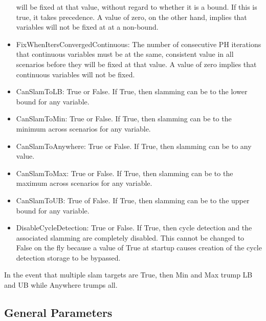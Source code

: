 \begin{itemize}
will be fixed at that value, without regard to whether it is a bound. If this is true, it takes precedence. A value of zero, on the other hand, implies that variables will not be fixed at at a non-bound.
\item FixWhenItersConvergedContinuous: The number of consecutive PH iterations that continuous variables must be at the same, consistent value in all scenarios before they
will be fixed at that value. A value of zero implies that continuous variables will not be fixed.
\item CanSlamToLB: True or False. If True, then slamming can be to the lower bound for any variable.
\item CanSlamToMin: True or False. If True, then slamming can be to the minimum across scenarios for any variable.
\item CanSlamToAnywhere: True or False. If True, then slamming can be to any value.
\item CanSlamToMax: True or False. If True, then slamming can be to the maximum across scenarios for any variable.
\item CanSlamToUB: True of False. If True, then slamming can be to the upper bound for any variable.
\item DisableCycleDetection: True or False. If True, then cycle detection and the associated slamming are completely disabled. This cannot be changed to False on the fly because a value of True at startup causes creation of the cycle detection storage to be bypassed.
\end{itemize}

In the event that multiple slam targets are True, then Min and Max trump LB and UB while Anywhere trumps all.

\subsection{General Parameters}

